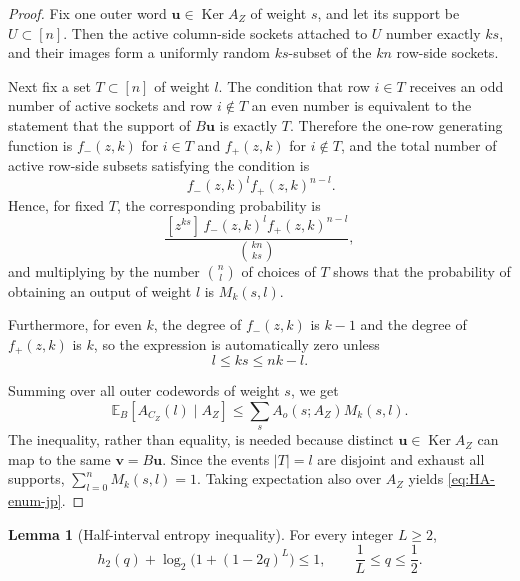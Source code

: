 \documentclass[11pt]{article}
\theoremstyle{definition}
\newtheorem{lemma}[theorem]{Lemma}
\newcommand{\EE}{\mathbb E}
\newcommand{\Ker}{\operatorname{Ker}}
\newcommand{\bu}{\mathbf u}
\newcommand{\bv}{\mathbf v}
\newcommand{\h}{h_2}
\newcommand{\CZ}{C_Z}
\begin{document}
\begin{proof}
Fix one outer word \(\bu\in\Ker A_Z\) of weight \(s\), and let its support be \(U\subset[n]\).
Then the active column-side sockets attached to \(U\) number exactly \(ks\),
and their images form a uniformly random \(ks\)-subset of the \(kn\) row-side sockets.

Next fix a set \(T\subset[n]\) of weight \(l\).
The condition that row \(i\in T\) receives an odd number of active sockets and row \(i\notin T\) an even number
is equivalent to the statement that the support of \(B\bu\) is exactly \(T\).
Therefore the one-row generating function is \(f_-(z,k)\) for \(i\in T\) and \(f_+(z,k)\) for \(i\notin T\),
and the total number of active row-side subsets satisfying the condition is
\begin{equation*}
[z^{ks}]\,f_-(z,k)^l f_+(z,k)^{n-l}.
\end{equation*}
Hence, for fixed \(T\), the corresponding probability is
\begin{equation*}
\frac{[z^{ks}]\,f_-(z,k)^l f_+(z,k)^{n-l}}{\binom{kn}{ks}},
\end{equation*}
and multiplying by the number \(\binom{n}{l}\) of choices of \(T\) shows that the probability of obtaining an output of weight \(l\)
is \(M_k(s,l)\).

Furthermore, for even \(k\), the degree of \(f_-(z,k)\) is \(k-1\) and the degree of \(f_+(z,k)\) is \(k\),
so the expression is automatically zero unless
\begin{equation*}
l\le ks\le nk-l.
\end{equation*}

Summing over all outer codewords of weight \(s\), we get
\begin{equation*}
\EE_B[A_{\CZ}(l)\mid A_Z]
\le
\sum_s A_o(s;A_Z) M_k(s,l).
\end{equation*}
The inequality, rather than equality, is needed because distinct \(\bu\in\Ker A_Z\) can map to the same \(\bv=B\bu\).
Since the events \(|T|=l\) are disjoint and exhaust all supports, \(\sum_{l=0}^n M_k(s,l)=1\).
Taking expectation also over \(A_Z\) yields \eqref{eq:HA-enum-jp}.
\end{proof}

\begin{lemma}[Half-interval entropy inequality]\label{lem:half-entropy-jp}
For every integer \(L\ge2\),
\begin{equation}\label{eq:scalar-half-ineq-jp}
\h(q)+\log_2\!\bigl(1+(1-2q)^L\bigr)\le1,
\qquad
\frac1L\le q\le\frac12.
\end{equation}
\end{lemma}
\end{document}
